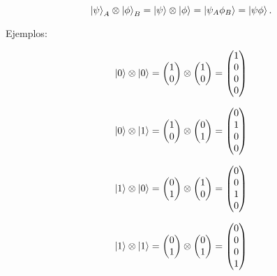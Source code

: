 \begin{equation}
    \ket{\psi}_A \otimes \ket{\phi}_B = \ket{\psi} \otimes \ket{\phi} = \ket{\psi_A \phi_B} = \ket{\psi\phi} .
\end{equation}

Ejemplos:

\begin{equation*}
    \ket{0} \otimes \ket{0}
    = \begin{pmatrix} 1\\0 \end{pmatrix} \otimes \begin{pmatrix} 1\\0 \end{pmatrix}
    = \begin{pmatrix} 1\\0\\0\\0 \end{pmatrix}
\end{equation*}

\begin{equation*}
    \ket{0} \otimes \ket{1}
    = \begin{pmatrix} 1\\0 \end{pmatrix} \otimes \begin{pmatrix} 0\\1 \end{pmatrix}
    = \begin{pmatrix} 0\\1\\0\\0 \end{pmatrix}
\end{equation*}

\begin{equation*}
    \ket{1} \otimes \ket{0}
    = \begin{pmatrix} 0\\1 \end{pmatrix} \otimes \begin{pmatrix} 1\\0 \end{pmatrix}
    = \begin{pmatrix} 0\\0\\1\\0 \end{pmatrix}
\end{equation*}

\begin{equation*}
    \ket{1} \otimes \ket{1}
    = \begin{pmatrix} 0\\1 \end{pmatrix} \otimes \begin{pmatrix} 0\\1 \end{pmatrix}
    = \begin{pmatrix} 0\\0\\0\\1 \end{pmatrix}
\end{equation*}

